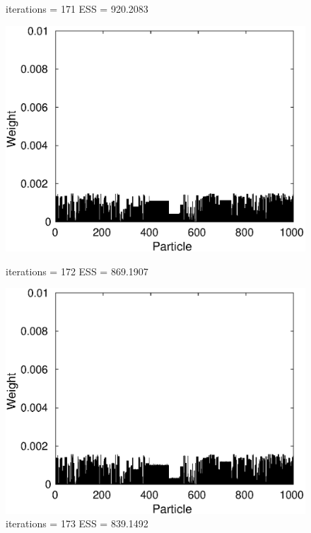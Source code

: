 \documentclass[12pt]{article}
\begin{document}
\begin{figure}[h!]
\begin{minipage}{0.5\textwidth}
		\caption*{iterations = 171 ESS = 920.2083}
	\end{minipage}
	\begin{minipage}{0.5\textwidth}
		\centering
		\includegraphics[scale = 0.5]{./Figures/172.eps}
		\caption*{iterations = 172 ESS = 869.1907}
	\end{minipage}%
	\begin{minipage}{0.5\textwidth}
		\centering
		\includegraphics[scale = 0.5]{./Figures/173.eps}
		\caption*{iterations = 173 ESS = 839.1492}
	\end{minipage}
	\begin{minipage}{0.5\textwidth}
		\centering

\end{minipage}
\end{figure}
\end{document}

